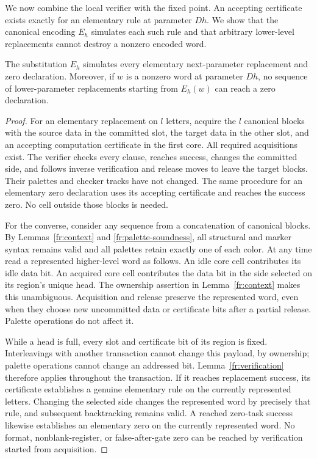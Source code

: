 We now combine the local verifier with the fixed point. An accepting
certificate exists exactly for an elementary rule at parameter $Dh$.
We show that the canonical encoding $E_h$ simulates each such rule and
that arbitrary lower-level replacements cannot destroy a nonzero
encoded word.

\begin{lemma}\label{fr:faithful}
The substitution $E_h$ simulates every elementary next-parameter
replacement and zero declaration.  Moreover, if $w$ is a nonzero
word at parameter $Dh$, no sequence of lower-parameter
replacements starting from $E_h(w)$ can reach a zero declaration.
\end{lemma}

\begin{proof}
For an elementary replacement on $l$ letters, acquire the $l$
canonical blocks with the source data in the committed slot, the
target data in the other slot, and an accepting computation
certificate in the first core.  All required acquisitions exist.
The verifier checks every clause, reaches success, changes the
committed side, and follows inverse verification and release moves
to leave the target blocks.  Their palettes and checker tracks
have not changed.  The same procedure for an elementary zero
declaration uses its accepting certificate and reaches the
success zero.  No cell outside those blocks is needed.

For the converse, consider any sequence from a concatenation of
canonical blocks.  By Lemmas~\ref{fr:context} and
\ref{fr:palette-soundness}, all structural and marker syntax
remains valid and all palettes retain exactly one of each color.
At any time read a represented higher-level word as follows.  An
idle core cell contributes its idle data bit.  An acquired core
cell contributes the data bit in the side selected on its region's
unique head.  The ownership assertion in Lemma~\ref{fr:context}
makes this unambiguous.  Acquisition and release preserve the
represented word, even when they choose new uncommitted data or
certificate bits after a partial release.  Palette operations do
not affect it.

While a head is full, every slot and certificate bit of its
region is fixed. Interleavings with another transaction cannot change
this payload, by ownership; palette operations cannot change an
addressed bit. Lemma~\ref{fr:verification} therefore applies throughout
the transaction. If it reaches replacement success, its certificate
establishes a genuine elementary rule on the currently represented
letters. Changing the selected side changes the represented word by
precisely that rule, and subsequent backtracking remains valid.
A reached zero-task success likewise establishes an elementary zero
on the currently represented word. No format, nonblank-register, or
false-after-gate zero can be reached by verification started from
acquisition.


\end{proof}
